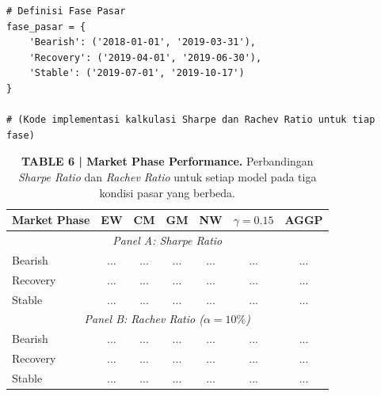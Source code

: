 \documentclass[12pt,a4paper]{article}
\begin{document}
\begin{lstlisting}[caption={Kalkulasi Metrik Berdasarkan Fase Pasar}]
# Definisi Fase Pasar
fase_pasar = {
    'Bearish': ('2018-01-01', '2019-03-31'),
    'Recovery': ('2019-04-01', '2019-06-30'),
    'Stable': ('2019-07-01', '2019-10-17')
}

# (Kode implementasi kalkulasi Sharpe dan Rachev Ratio untuk tiap fase)
\end{lstlisting}

\begin{table}[h]
    \centering
    \footnotesize
    \caption{\textbf{TABLE 6 | Market Phase Performance.} Perbandingan \textit{Sharpe Ratio} dan \textit{Rachev Ratio} untuk setiap model pada tiga kondisi pasar yang berbeda.}
    \begin{tabular}{lcccccc}
        \toprule
        Market Phase & EW & CM & GM & NW & $\gamma=0.15$ & AGGP \\
        \midrule
        \multicolumn{7}{c}{\textit{Panel A: Sharpe Ratio}} \\
        Bearish & ... & ... & ... & ... & ... & ... \\
        Recovery & ... & ... & ... & ... & ... & ... \\
        Stable & ... & ... & ... & ... & ... & ... \\
        \midrule
        \multicolumn{7}{c}{\textit{Panel B: Rachev Ratio ($\alpha=10\%$)}} \\
        Bearish & ... & ... & ... & ... & ... & ... \\
        Recovery & ... & ... & ... & ... & ... & ... \\
        Stable & ... & ... & ... & ... & ... & ... \\
        \bottomrule
    \end{tabular}
\end{table}
\end{document}
